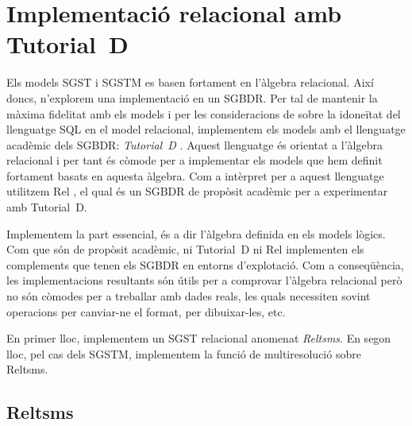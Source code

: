 \chapter{Implementació relacional amb Tutorial~D}
\label{sec:implementacio:relacional}

Els models \gls{SGST} i \gls{SGSTM} es basen fortament en l'àlgebra
relacional.  Així doncs, n'explorem una implementació en un
\gls{SGBDR}. Per tal de mantenir la màxima fidelitat amb els models i
per les consideracions de \textcite[cap.~1--4]{date04:introduction8}
sobre la idoneïtat del llenguatge \gls{SQL} en el model relacional,
implementem els models amb el llenguatge acadèmic dels \gls{SGBDR}:
\emph{Tutorial~D} \parencite{date04:introduction8,date:thethirdmanifesto,date:tutoriald}. Aquest
llenguatge és orientat a l'àlgebra relacional i per tant és còmode per
a implementar els models que hem definit fortament basats en aquesta
àlgebra.  Com a intèrpret per a aquest llenguatge utilitzem
Rel \parencite{rel}, el qual és un \gls{SGBDR} de propòsit acadèmic
per a experimentar amb Tutorial~D.





Implementem la part essencial, és a dir l'àlgebra definida en els
models lògics. Com que són de propòsit acadèmic, ni Tutorial~D ni Rel
implementen els complements que tenen els \gls{SGBDR} en entorns
d'explotació. Com a conseqüència, les implementacions resultants són
útils per a comprovar l'àlgebra relacional però no són còmodes per a
treballar amb dades reals, les quals necessiten sovint operacions
per canviar-ne el format, per dibuixar-les, etc.


En primer lloc, implementem un \gls{SGST} relacional anomenat
\emph{Reltsms}. En segon lloc, pel cas dels \gls{SGSTM}, implementem
la funció de multiresolució sobre Reltsms.



\section{Reltsms}


